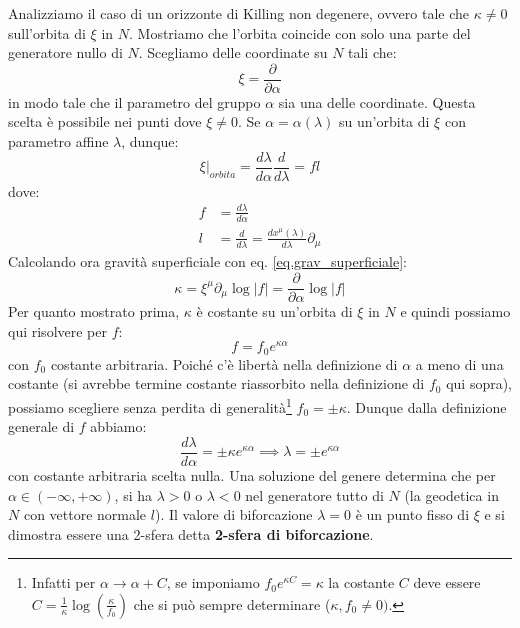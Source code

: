 Analizziamo il caso di un orizzonte di Killing non degenere, ovvero tale che $\kappa \neq 0 $ sull'orbita di $\xi$ in $N$. Mostriamo che l'orbita coincide con solo una parte del generatore nullo di $N$.
Scegliamo delle coordinate su $N$ tali che:
\begin{equation*}
    \xi = \frac{\partial}{\partial \alpha}
\end{equation*}
in modo tale che il parametro del gruppo $\alpha$ sia una delle coordinate. Questa scelta è possibile nei punti dove $\xi \neq 0$. Se $\alpha = \alpha(\lambda)$ su un'orbita di $\xi$ con parametro affine $\lambda$, dunque:
\begin{equation*}
    \xi|_{orbita} =\frac{d \lambda}{d\alpha}\frac{d}{d\lambda} = fl
\end{equation*}
dove:
\begin{align*}
    f &=\frac{d\lambda}{d\alpha} \\
    l &= \frac{d}{d\lambda}=\frac{d x^\mu(\lambda)}{d\lambda}\partial_\mu
\end{align*}
Calcolando ora gravità superficiale con eq. \ref{eq.grav_superficiale}:
\begin{equation*}
    \kappa = \xi^\mu \partial_\mu \log|f| = \frac{\partial}{\partial \alpha} \log|f|
\end{equation*}
Per quanto mostrato prima, $\kappa$ è costante su un'orbita di $\xi$  in $N$ e quindi possiamo qui risolvere per $f$:
\begin{equation*}
    f = f_0 e^{\kappa\alpha}
\end{equation*}
con $f_0$ costante arbitraria. Poiché c'è libertà nella definizione di $\alpha$ a meno di una costante (si avrebbe termine costante riassorbito nella definizione di $f_0$ qui sopra), possiamo scegliere senza perdita di generalità\footnote{Infatti per $\alpha \rightarrow \alpha + C$, se imponiamo $f_0e^{\kappa C} = \kappa$ la costante $C$ deve essere $C= \frac{1}{\kappa}\log(\frac{\kappa}{f_0})$ che si può sempre determinare ($\kappa, f_0 \neq 0)$.} $f_0 = \pm \kappa$. Dunque dalla definizione generale di $f$ abbiamo:
\begin{equation*}
    \frac{d\lambda}{d\alpha} = \pm \kappa e^{\kappa \alpha} \implies \lambda =\pm e^{\kappa\alpha}
\end{equation*}
con costante arbitraria scelta nulla. Una soluzione del genere determina che per $\alpha \in (-\infty, +\infty)$, si ha $\lambda > 0$ o $\lambda < 0$ nel generatore tutto di $N$ (la geodetica in $N$ con vettore normale $l$). Il valore di biforcazione $\lambda = 0$ è un punto fisso di $\xi$ e si dimostra essere una 2-sfera detta \textbf{2-sfera di biforcazione}.
